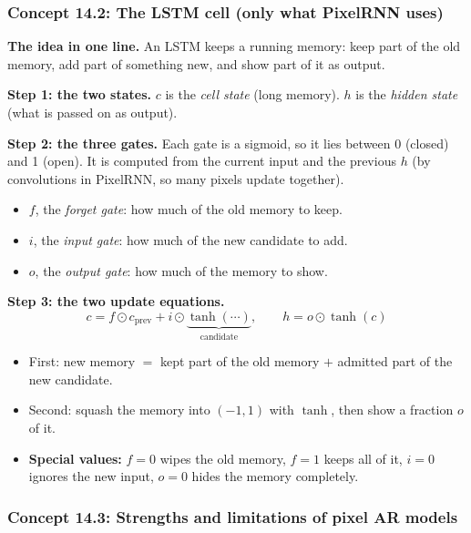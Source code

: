 \documentclass[12pt,a4paper]{article}
\begin{document}
\subsubsection{Concept 14.2: The LSTM cell (only what PixelRNN uses)}\label{c14-2}

\textbf{The idea in one line.} An LSTM keeps a running memory: keep part of the old memory, add part of something new, and show part of it as output.

\textbf{Step 1: the two states.} $c$ is the \emph{cell state} (long memory). $h$ is the \emph{hidden state} (what is passed on as output).

\textbf{Step 2: the three gates.} Each gate is a sigmoid, so it lies between 0 (closed) and 1 (open). It is computed from the current input and the previous $h$ (by convolutions in PixelRNN, so many pixels update together).
\begin{itemize}[nosep]
  \item $f$, the \emph{forget gate}: how much of the old memory to keep.
  \item $i$, the \emph{input gate}: how much of the new candidate to add.
  \item $o$, the \emph{output gate}: how much of the memory to show.
\end{itemize}

\textbf{Step 3: the two update equations.}
\[
c=f\odot c_{\text{prev}}+i\odot\underbrace{\tanh(\cdots)}_{\text{candidate}},\qquad h=o\odot\tanh(c)
\]
\begin{itemize}[nosep]
  \item First: new memory $=$ kept part of the old memory $+$ admitted part of the new candidate.
  \item Second: squash the memory into $(-1,1)$ with $\tanh$, then show a fraction $o$ of it.
  \item \textbf{Special values:} $f=0$ wipes the old memory, $f=1$ keeps all of it, $i=0$ ignores the new input, $o=0$ hides the memory completely.
\end{itemize}

\subsubsection{Concept 14.3: Strengths and limitations of pixel AR models}\label{c14-3}
\end{document}
